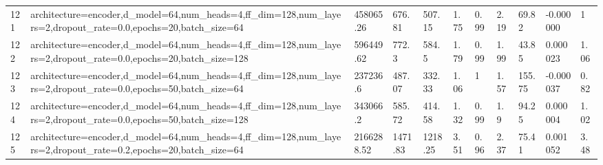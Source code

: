 \begin{longtable}{C{0.8cm} L{2cm} C{1.15cm} C{1.15cm} C{1.15cm} C{1.15cm} C{0.85cm} C{1.25cm} C{1.2cm} C{1.5cm} C{1.0cm}}
121 & architecture=encoder,\newline d\_model=64,\newline num\_heads=4,\newline ff\_dim=128,\newline num\_layers=2,\newline dropout\_rate=0.0,\newline epochs=20,\newline batch\_size=64 & 458065.26 & 676.81 & 507.15 & 1.75 & 0.99 & 2.19 & 69.82 & -0.000000 & 1 \\
122 & architecture=encoder,\newline d\_model=64,\newline num\_heads=4,\newline ff\_dim=128,\newline num\_layers=2,\newline dropout\_rate=0.0,\newline epochs=20,\newline batch\_size=128 & 596449.62 & 772.3 & 584.5 & 1.79 & 0.99 & 1.99 & 43.85 & 0.000023 & 1.06 \\
123 & architecture=encoder,\newline d\_model=64,\newline num\_heads=4,\newline ff\_dim=128,\newline num\_layers=2,\newline dropout\_rate=0.0,\newline epochs=50,\newline batch\_size=64 & 237236.6 & 487.07 & 332.33 & 1.06 & 1 & 1.57 & 155.75 & -0.000037 & 0.82 \\
124 & architecture=encoder,\newline d\_model=64,\newline num\_heads=4,\newline ff\_dim=128,\newline num\_layers=2,\newline dropout\_rate=0.0,\newline epochs=50,\newline batch\_size=128 & 343066.2 & 585.72 & 414.58 & 1.32 & 0.99 & 1.9 & 94.25 & 0.000004 & 1.02 \\
125 & architecture=encoder,\newline d\_model=64,\newline num\_heads=4,\newline ff\_dim=128,\newline num\_layers=2,\newline dropout\_rate=0.2,\newline epochs=20,\newline batch\_size=64 & 2166288.52 & 1471.83 & 1218.25 & 3.51 & 0.96 & 2.37 & 75.41 & 0.001052 & 3.48 \\

\end{longtable}
